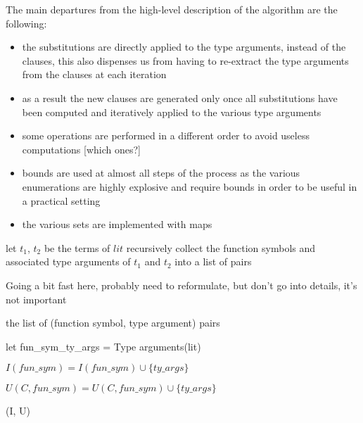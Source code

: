 \documentclass[]{ceurart}
\begin{document}
The main departures from the high-level description of the algorithm are the following:
\begin{itemize}
   \item the substitutions are directly applied to the type arguments, instead of the clauses, this also dispenses us from having to re-extract the type arguments from the clauses at each iteration
   \item as a result the new clauses are generated only once all substitutions have been computed and iteratively applied to the various type arguments
   \item some operations are performed in a different order to avoid useless computations [which ones?]
   \item bounds are used at almost all steps of the process as the various enumerations are highly explosive and require bounds in order to be useful in a practical setting
   \item the various sets are implemented with maps
\end{itemize}

\begin{algorithm}[th]
\begin{algorithmic}[1]

   \State let \(t_1\), \(t_2\) be the terms of \(lit\)
   \State recursively collect the function symbols and associated type arguments of \(t_1\) and \(t_2\) into a list of pairs

   \State \Comment Going a bit fast here, probably need to reformulate, but don't go into details, it's not important

   \State \Return the list of (function symbol, type argument) pairs

\EndFunction
\end{algorithmic}
\end{algorithm}


\begin{algorithm}[tbh]
\begin{algorithmic}[1]
         \State let fun\_sym\_ty\_args = Type arguments(lit)

            \State \(I(fun\_sym) = I(fun\_sym) \cup \{ty\_args\}\)

         \Else

            \State \(U(C, fun\_sym) = U(C, fun\_sym) \cup \{ty\_args\}\)

         \EndIf
         \EndFor
      \EndFor
   \EndFor

   \State \Return (I, U)

\EndFunction
\end{algorithmic}
\end{algorithm}
\end{document}

